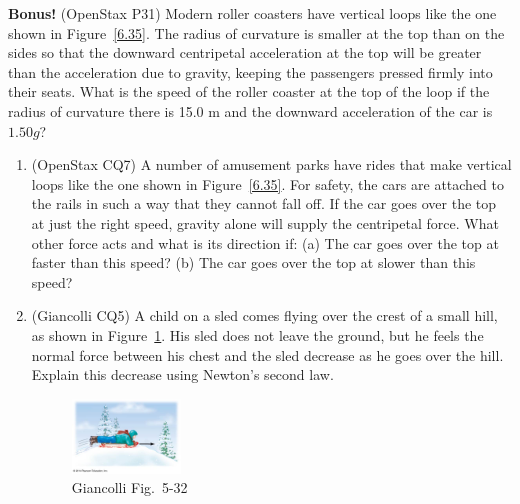 \documentclass[10pt,twocolumn]{exam}
\def\answer#1{\footnotetext{#1}}
\def\myquestion{\question\stepcounter{footnote}}
\begin{document}
\begin{questions}
\myquestion \textbf{Bonus!} (OpenStax P31) 
Modern roller coasters have vertical loops like the one shown in Figure~\ref{6.35}. The radius of curvature is smaller at the top than on the sides so that the downward centripetal acceleration at the top will be greater than the acceleration due to gravity, keeping the passengers pressed firmly into their seats. What is the speed of the roller coaster at the top of the loop if the radius of curvature there is 15.0 m and the downward acceleration of the car is $1.50 g$?
\answer{(a) 33.3 rad/s; (b) 500 N; (c) 40.8 m}



  

\begin{enumerate}[resume*]
  \item (OpenStax CQ7) A number of amusement parks have rides that make vertical loops like the one shown in Figure~\ref{6.35}. For safety, the cars are attached to the rails in such a way that they cannot fall off. If the car goes over the top at just the right speed, gravity alone will supply the centripetal force. What other force acts and what is its direction if: (a) The car goes over the top at faster than this speed? (b) The car goes over the top at slower than this speed?
  


  \item (Giancolli CQ5) A child on a sled comes flying over the crest of a small hill, as shown in Figure~\ref{G5-32}. His sled does not leave the ground, but he feels the normal force between his chest and the sled decrease as he goes over the hill. Explain this decrease using Newton's second law.
  
    \begin{figure}[h]
      \centering
      \includegraphics[width=2.9cm]{05_32_Figure.jpg}
      \caption{Giancolli Fig.~5-32}
      \label{G5-32}
    \end{figure}


\end{enumerate}
\end{questions}
\end{document}
